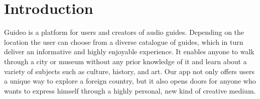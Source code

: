 \documentclass[12pt]{article}
\theoremstyle{definition}
\newenvironment{text}{
}{}
\begin{document}
\tableofcontents
\pagebreak
 
\section{Introduction}
\begin{text}
Guideo is a platform for users and creators of audio guides. Depending on the location the user can choose from a diverse catalogue of guides, which in turn deliver an informative and highly enjoyable experience. 
It enables anyone to walk through a city or museum without any prior knowledge of it and learn about a variety of subjects such as culture, history, and art. 
Our app not only offers users a unique way to explore a foreign country, but it also opens doors for anyone who wants to express himself through a highly personal, new kind of creative medium. 
 
\end{text}
\pagebreak
 
\end{document}
